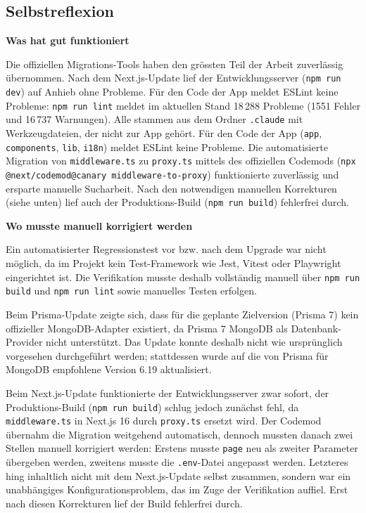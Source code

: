 \documentclass[11pt,a4paper]{article}
\newcommand{\minihead}[1]{\par\needspace{5\baselineskip}\noindent\textbf{#1}\par\nobreak}
\let\oldsubsection\subsection
\renewcommand{\subsection}{\needspace{6\baselineskip}\oldsubsection}
\begin{document}
\subsection{Selbstreflexion}

\minihead{Was hat gut funktioniert}
Die offiziellen Migrations-Tools haben den grössten Teil der Arbeit zuverlässig übernommen. Nach dem Next.js-Update lief der Entwicklungsserver (\texttt{npm run dev}) auf Anhieb ohne Probleme. Für den Code der App meldet ESLint keine Probleme: \texttt{npm run lint} meldet im aktuellen Stand 18\,288 Probleme (1551 Fehler und 16\,737 Warnungen). Alle stammen aus dem Ordner \texttt{.claude} mit Werkzeugdateien, der nicht zur App gehört. Für den Code der App (\texttt{app}, \texttt{components}, \texttt{lib}, \texttt{i18n}) meldet ESLint keine Probleme. Die automatisierte Migration von \texttt{middleware.ts} zu \texttt{proxy.ts} mittels des offiziellen Codemods (\texttt{npx @next/codemod@canary middleware-to-proxy}) funktionierte zuverlässig und ersparte manuelle Sucharbeit. Nach den notwendigen manuellen Korrekturen (siehe unten) lief auch der Produktions-Build (\texttt{npm run build}) fehlerfrei durch.

\minihead{Wo musste manuell korrigiert werden}
Ein automatisierter Regressionstest vor bzw. nach dem Upgrade war nicht möglich, da im Projekt kein Test-Framework wie Jest, Vitest oder Playwright eingerichtet ist. Die Verifikation musste deshalb vollständig manuell über \texttt{npm run build} und \texttt{npm run lint} sowie manuelles Testen erfolgen.

Beim Prisma-Update zeigte sich, dass für die geplante Zielversion (Prisma 7) kein offizieller MongoDB-Adapter existiert, da Prisma 7 MongoDB als Datenbank-Provider nicht unterstützt. Das Update konnte deshalb nicht wie ursprünglich vorgesehen durchgeführt werden; stattdessen wurde auf die von Prisma für MongoDB empfohlene Version 6.19 aktualisiert.

Beim Next.js-Update funktionierte der Entwicklungsserver zwar sofort, der Produktions-Build (\texttt{npm run build}) schlug jedoch zunächst fehl, da \texttt{middleware.ts} in Next.js 16 durch \texttt{proxy.ts} ersetzt wird. Der Codemod übernahm die Migration weitgehend automatisch, dennoch mussten danach zwei Stellen manuell korrigiert werden: Erstens musste \texttt{page} neu als zweiter Parameter übergeben werden, zweitens musste die \texttt{.env}-Datei angepasst werden. Letzteres hing inhaltlich nicht mit dem Next.js-Update selbst zusammen, sondern war ein unabhängiges Konfigurationsproblem, das im Zuge der Verifikation auffiel. Erst nach diesen Korrekturen lief der Build fehlerfrei durch.
\end{document}
